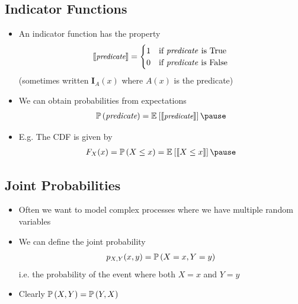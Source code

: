 \begin{slide}
\section{Indicator Functions}

\begin{PauseHighLight}
  \begin{itemize}
  \item An indicator function has the property
    \begin{align*}
      \left\llbracket { \small \text{\it predicate}} \right\rrbracket =
      \begin{cases}
        1 & \text{if \textit{predicate }is True}\\
        0 & \text{if \textit{predicate} is False}
      \end{cases}
    \end{align*}
    (sometimes written $\bm{I}_A(x)$ where $A(x)$ is the predicate)\pause
  \item We can obtain probabilities from expectations
    \begin{align*}
      \Prob{\text{\it predicate}} = \av{\pred{\text{\it predicate}}}\pause
    \end{align*}
  \item E.g. The CDF is given by
    \begin{align*}
      F_X(x) = \Prob{X\leq x} = \av{\pred{X\leq x}}\pause
    \end{align*}
  \end{itemize}
\end{PauseHighLight}

\end{slide}


\Outline %

\begin{slide}
\section{Joint Probabilities}
  
\begin{PauseHighLight}
  \begin{itemize}
  \item Often we want to model complex processes where we have
    multiple random variables\pause
  \item We can define the joint probability
    \begin{align*}
      p_{X,Y}(x, y) = \mathbb{P}\left( X=x, Y=y \right)
    \end{align*}
    i.e. the probability of the event where both $X=x$ and $Y=y$\pause
  \item Clearly $\mathbb{P}\left( X,Y \right) = \mathbb{P}\left( Y,X \right)$\pause
  \end{itemize}
\end{PauseHighLight}
\end{slide}

